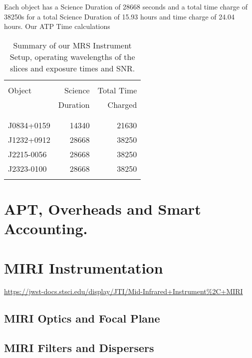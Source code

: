 Each object has a Science Duration of 28668 seconds and a total time charge of 38250s 
for a total Science Duration of  15.93 hours and time charge of 24.04 hours. 
Our ATP Time calculations
\begin{table}
\begin{center}
\begin{tabular}{|| l | r | r ||}
  \hline\hline
  && \\
  Object   	& 	Science           & Total Time          \\
         	        &      Duration        & Charged \\
  && \\
  \hline
  && \\
  J0834+0159  &       14340                & 21630   \\
  J1232+0912 &     28668         & 38250 \\
J2215-0056&      28668  &         38250 \\
J2323-0100 &      28668   &       38250 \\
  && \\
  \hline\hline
\end{tabular}
\caption{Summary of our MRS Instrument Setup, 
  operating wavelengths of the slices and exposure 
  times and SNR. 
}
\label{tab:ETC_calcs} 
\end{center}
\end{table}


\section{APT, Overheads and Smart Accounting.}


\section{MIRI Instrumentation}
\href{https://jwst-docs.stsci.edu/display/JTI/Mid-Infrared+Instrument\%2C+MIRI}{https://jwst-docs.stsci.edu/display/JTI/Mid-Infrared+Instrument\%2C+MIRI}

    \subsection{MIRI Optics and Focal Plane}
    \subsection{MIRI Filters and Dispersers}
